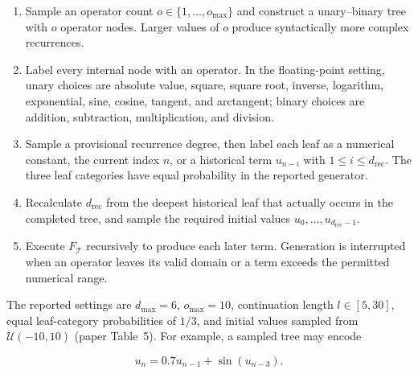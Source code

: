 \begin{enumerate}
    \item Sample an operator count $o\in\{1,\ldots,o_{\max}\}$ and construct a
    unary--binary tree with $o$ operator nodes. Larger values of $o$ produce
    syntactically more complex recurrences.

    \item Label every internal node with an operator. In the floating-point
    setting, unary choices are absolute value, square, square root, inverse,
    logarithm, exponential, sine, cosine, tangent, and arctangent; binary
    choices are addition, subtraction, multiplication, and division.

    \item Sample a provisional recurrence degree, then label each leaf as a
    numerical constant, the current index $n$, or a historical term
    $u_{n-i}$ with $1\leq i\leq d_{\mathrm{rec}}$. The three leaf categories
    have equal probability in the reported generator.

    \item Recalculate $d_{\mathrm{rec}}$ from the deepest historical leaf that
    actually occurs in the completed tree, and sample the required initial
    values $u_0,\ldots,u_{d_{\mathrm{rec}}-1}$.

    \item Execute $F_{\mathcal{T}}$ recursively to produce each later term.
    Generation is interrupted when an operator leaves its valid domain or a
    term exceeds the permitted numerical range.
\end{enumerate}

The reported settings are $d_{\max}=6$, $o_{\max}=10$, continuation length
$l\in[5,30]$, equal leaf-category probabilities of $1/3$, and initial values
sampled from $\mathcal{U}(-10,10)$ (paper Table~5). For example, a sampled tree
may encode

\begin{equation}
    u_n=0.7u_{n-1}+\sin(u_{n-3}).
\end{equation}

